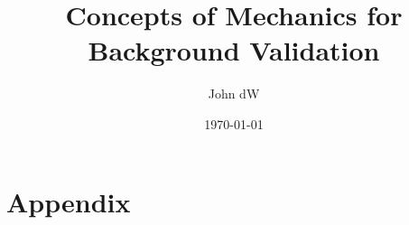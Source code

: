 \documentclass[12pt,oneside,a4paper]{article}
\title{Concepts of Mechanics for Background Validation}
\author{John dW}
\date{\today}
\begin{document}
\maketitle


\newpage

\newpage

\newpage


\part*{Appendix}
\appendix


\end{document}
